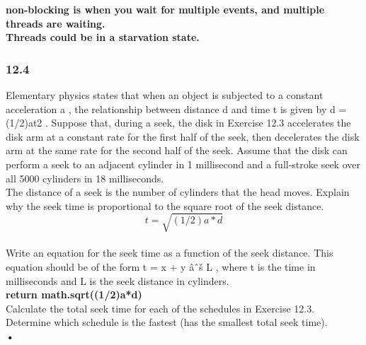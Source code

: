 \documentclass[a4paper,10pt,titlepage]{report}
\begin{document}
\hspace{15mm} \textbf{ non-blocking is when you wait for multiple events, and multiple threads are waiting.} \\

\hspace{15mm} \textbf{ Threads could be in a starvation state. } \\


\subsubsection{12.4} Elementary physics states that when an object is subjected to a constant acceleration a , the relationship between distance d and time t is given by d = (1/2)at2 . Suppose that, during a seek, the disk in Exercise 12.3 accelerates the disk arm at a constant rate for the first half of the seek, then decelerates the disk arm at the same rate for the second half of the seek. Assume that the disk can perform a seek to an adjacent cylinder in 1 millisecond and a full-stroke seek over all 5000 cylinders in 18 milliseconds.\\
\hspace{10mm} 	The distance of a seek is the number of cylinders that the head moves. Explain why the seek time is proportional to the square root of the seek distance.\\
\hspace{15mm} 
\begin{equation}
t = \sqrt{(1/2)a*d}
\end{equation} \\



\hspace{10mm} 	Write an equation for the seek time as a function of the seek distance. This equation should be of the form t = x + y âˆš L , where t is the time in milliseconds and L is the seek distance in cylinders.\\
\hspace{15mm} \textbf{return math.sqrt((1/2)a*d)} \\
	
\hspace{10mm} 	Calculate the total seek time for each of the schedules in Exercise 12.3. Determine which schedule is the fastest (has the smallest total seek time). \\
\hspace{15mm} \textbf{•} \\
\end{document}
